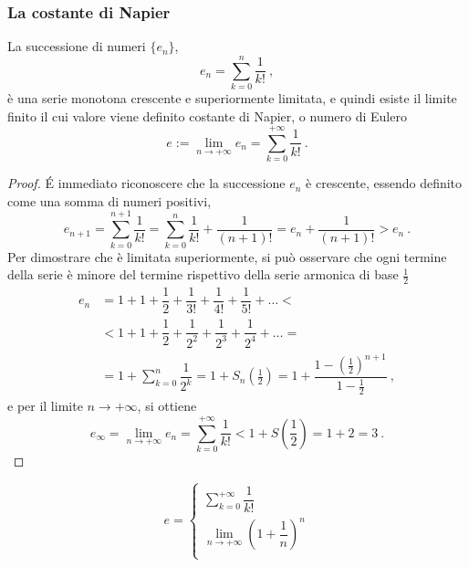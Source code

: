 \subsubsection{La costante di Napier}\label{sec:napier}
\begin{definition}
La successione di numeri $\{ e_n \}$,
\begin{equation}
    e_n = \sum_{k=0}^{n} \frac{1}{k!} \ ,
\end{equation}
è una serie monotona crescente e superiormente limitata, e quindi esiste il limite finito il cui valore viene definito costante di Napier, o numero di Eulero
\begin{equation}
   e := \lim_{n \rightarrow +\infty} e_n = \sum_{k=0}^{+\infty} \frac{1}{k!} \ . 
\end{equation}
\end{definition}
\begin{proof}
\'E immediato riconoscere che la successione $e_n$ è crescente, essendo definito come una somma di numeri positivi,
\begin{equation}
    e_{n+1} = \sum_{k=0}^{n+1} \dfrac{1}{k!} = \sum_{k=0}^{n} \dfrac{1}{k!} + \dfrac{1}{(n+1)!} = e_n + \dfrac{1}{(n+1)!} > e_n \ .
\end{equation}
Per dimostrare che è limitata superiormente, si può osservare che ogni termine della serie è minore del termine rispettivo della serie armonica di base $\frac{1}{2}$
\begin{equation}
\begin{aligned}
    e_{n}
    & = 1 + 1 + \dfrac{1}{2} + \dfrac{1}{3!} + \dfrac{1}{4!}  + \dfrac{1}{5!}  + \dots < \\
    & < 1 + 1 + \dfrac{1}{2} + \dfrac{1}{2^2}+ \dfrac{1}{2^3} + \dfrac{1}{2^4} + \dots = \\
    & = 1 + \sum_{k=0}^{n} \dfrac{1}{2^k} = 1 + S_n\left(\frac{1}{2}\right) 
      = 1 + \dfrac{1 - \left(\frac{1}{2}\right)^{n+1}}{1 - \frac{1}{2}} \ ,
\end{aligned}
\end{equation}
e per il limite $n \rightarrow +\infty$, si ottiene
\begin{equation}
    e_{\infty} = \lim_{n \rightarrow +\infty} e_n = \sum_{k=0}^{+\infty} \dfrac{1}{k!} < 1 + S\left(\dfrac{1}{2}\right) = 1 + 2 = 3 \ .
\end{equation}
\end{proof}
\begin{definition}
\begin{equation}
    e = 
    \begin{cases}
        \displaystyle\sum_{k=0}^{+\infty} \dfrac{1}{k!} \\
        \displaystyle\lim_{n \rightarrow +\infty} \left( 1 + \dfrac{1}{n} \right)^n \\ 
    \end{cases}
\end{equation}
\end{definition}

